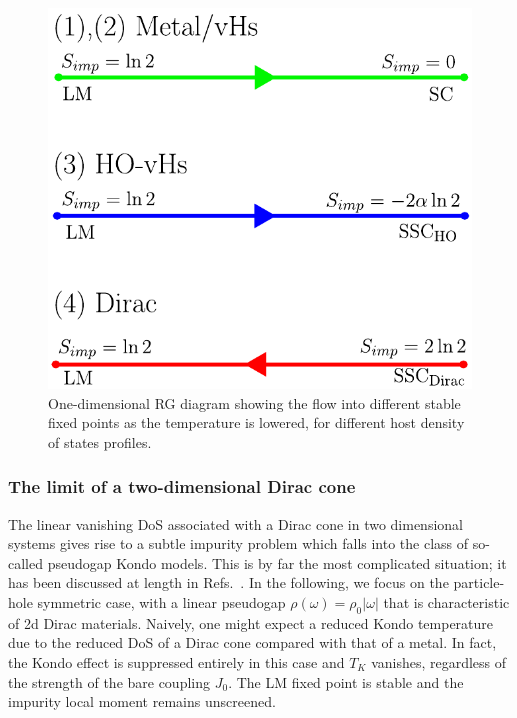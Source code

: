 \begin{figure}[t]
	\includegraphics[width=0.8\linewidth]{figures/chapter2/FigureFixPointv4.pdf}
	\caption{
		\small  One-dimensional RG diagram showing the flow into different stable fixed points as the temperature is lowered, for different host density of states profiles.}
	\label{fig:RGFlow}
\end{figure}

\subsubsection{The limit of a two-dimensional Dirac cone}

The linear vanishing DoS associated with a Dirac cone in two dimensional systems gives rise to a subtle impurity problem which falls into the class of so-called pseudogap Kondo models. This is by far the most complicated situation; it has been discussed at length in Refs.~\cite{Ingersent1998,Fritz2004a,Fritz2004b,Fritz2013,logan2014common}. In the following, we focus on the particle-hole symmetric case, with a linear pseudogap $\rho(\omega)=\rho_0|\omega|$ that is characteristic of 2d Dirac materials. Naively, one might expect a reduced Kondo temperature due to the reduced DoS of a Dirac cone compared with that of a metal. In fact, the Kondo effect is suppressed entirely in this case and $T_K$ vanishes, regardless of the strength of the bare coupling $J_0$. The LM fixed point is stable and the impurity local moment remains unscreened.

